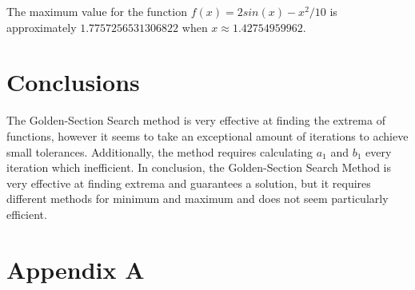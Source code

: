 \documentclass[12pt, letterpaper]{article}
\begin{document}
	The maximum value for the function $f(x)=2 sin(x)-x^2/10$ is approximately $1.7757256531306822$ when $x\approx1.42754959962$.


\section{\label{conclusion}Conclusions}
	The Golden-Section Search method is very effective at finding the extrema of functions, however it seems to take an exceptional amount of iterations to achieve small tolerances. Additionally, the method requires calculating $a_1$ and $b_1$ every iteration which inefficient. In conclusion, the Golden-Section Search Method is very effective at finding extrema and guarantees a solution, but it requires different methods for minimum and maximum and does not seem particularly efficient. 

\pagebreak
\appendix
	\section{Appendix A}
\end{document}
